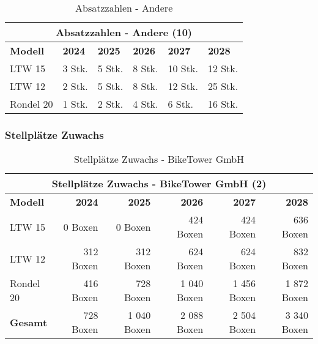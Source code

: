 \begin{table}[H]
    \centering
    \begin{tabular}{llllll}
        \multicolumn{6}{c}{\textbf{Absatzzahlen - Andere (10)}}                                         \\
        \toprule
        \textbf{Modell} & \textbf{2024} & \textbf{2025} & \textbf{2026} & \textbf{2027} & \textbf{2028} \\
        \midrule
        LTW 15          & 3 Stk.        & 5 Stk.        & 8 Stk.        & 10 Stk.       & 12 Stk.       \\
        LTW 12          & 2 Stk.        & 5 Stk.        & 8 Stk.        & 12 Stk.       & 25 Stk.       \\
        Rondel 20       & 1 Stk.        & 2 Stk.        & 4 Stk.        & 6 Stk.        & 16 Stk.       \\
        \midrule
    \end{tabular}
    \caption{Absatzzahlen - Andere}
    \label{tab:absatzzahlen_andere}
\end{table}

\subsubsection{Stellplätze Zuwachs}

\begin{table}[H]
    \centering
    \begin{tabular}{lrrrrr}
        \multicolumn{6}{c}{\textbf{Stellplätze Zuwachs - BikeTower GmbH (2)}}                           \\
        \toprule
        \textbf{Modell} & \textbf{2024} & \textbf{2025} & \textbf{2026} & \textbf{2027} & \textbf{2028} \\
        \midrule
        LTW 15          & 0 Boxen       & 0 Boxen       & 424 Boxen     & 424 Boxen     & 636 Boxen     \\
        LTW 12          & 312 Boxen     & 312 Boxen     & 624 Boxen     & 624 Boxen     & 832 Boxen     \\
        Rondel 20       & 416 Boxen     & 728 Boxen     & 1 040 Boxen   & 1 456 Boxen   & 1 872 Boxen   \\
        \midrule
        \textbf{Gesamt} & 728 Boxen     & 1 040 Boxen   & 2 088 Boxen   & 2 504 Boxen   & 3 340 Boxen   \\
        \bottomrule
    \end{tabular}
    \caption{Stellplätze Zuwachs - BikeTower GmbH}
    \label{tab:stellplaetze_zuwachs_biketower}
\end{table}

